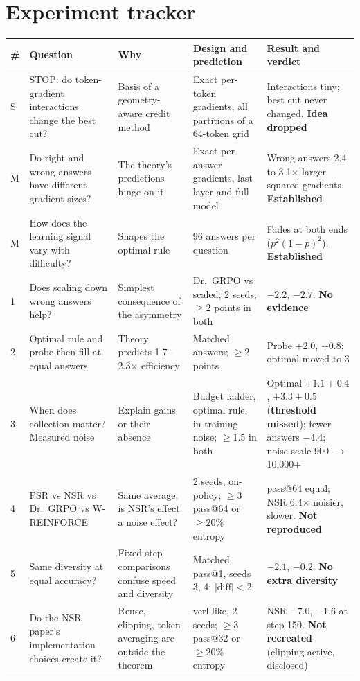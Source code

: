 \documentclass[11pt]{article}
\begin{document}
\section{Experiment tracker}\label{app:tracker}
\small
\begin{longtable}{@{}P{0.5cm}P{2.6cm}P{3.2cm}P{3.6cm}P{4.2cm}@{}}
\toprule
\textbf{\#} & \textbf{Question} & \textbf{Why} & \textbf{Design and prediction} & \textbf{Result and verdict}\\
\midrule
\endhead
S & STOP: do token-gradient interactions change the best cut? & Basis of a geometry-aware credit method & Exact per-token gradients, all partitions of a 64-token grid & Interactions tiny; best cut never changed. \textbf{Idea dropped}\\
\midrule
M & Do right and wrong answers have different gradient sizes? & The theory's predictions hinge on it & Exact per-answer gradients, last layer and full model & Wrong answers 2.4 to 3.1$\times$ larger squared gradients. \textbf{Established}\\
\midrule
M & How does the learning signal vary with difficulty? & Shapes the optimal rule & 96 answers per question & Fades at both ends ($p^2(1-p)^2$). \textbf{Established}\\
 & Does scaling down wrong answers help? & Simplest consequence of the asymmetry & Dr.\ GRPO vs scaled, 2 seeds; $\ge2$ points in both & $-2.2$, $-2.7$. \textbf{No evidence}\\
 & Optimal rule and probe-then-fill at equal answers & Theory predicts 1.7--2.3$\times$ efficiency & Matched answers; $\ge2$ points & Probe $+2.0$, $+0.8$; optimal moved to 3\\
 & When does collection matter? Measured noise & Explain gains or their absence & Budget ladder, optimal rule, in-training noise; $\ge1.5$ in both & Optimal $+1.1\pm0.4$, $+3.3\pm0.5$ (\textbf{threshold missed}); fewer answers $-4.4$; noise scale 900 $\to$ 10,000+\\
 & PSR vs NSR vs Dr.\ GRPO vs W-REINFORCE & Same average; is NSR's effect a noise effect? & 2 seeds, on-policy; $\ge3$ pass@64 or $\ge20\%$ entropy & pass@64 equal; NSR 6.4$\times$ noisier, slower. \textbf{Not reproduced}\\
 & Same diversity at equal accuracy? & Fixed-step comparisons confuse speed and diversity & Matched pass@1, seeds 3, 4; $|\text{diff}|<2$ & $-2.1$, $-0.2$. \textbf{No extra diversity}\\
 & Do the NSR paper's implementation choices create it? & Reuse, clipping, token averaging are outside the theorem & verl-like, 2 seeds; $\ge3$ pass@32 or $\ge20\%$ entropy & NSR $-7.0$, $-1.6$ at step 150. \textbf{Not recreated} (clipping active, disclosed)\\

\end{longtable}
\end{document}
